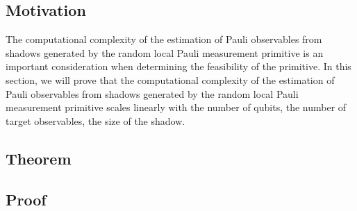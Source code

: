 \documentclass[12pt]{article}
\begin{document}
    \subsection{Motivation}
    The computational complexity of the estimation of Pauli observables from shadows generated by the random local Pauli measurement primitive is an important consideration when determining the feasibility of the primitive. In this section, we will prove that the computational complexity of the estimation of Pauli observables from shadows generated by the random local Pauli measurement primitive scales linearly with the number of qubits, the number of target observables, the size of the shadow.

    \subsection{Theorem}

    \subsection{Proof}

    \printbibliography[title={References}]
\end{document}
